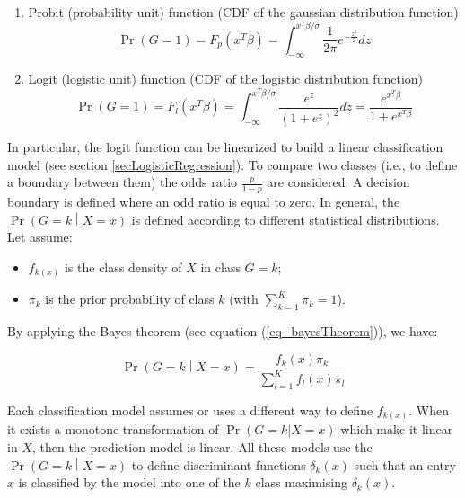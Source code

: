 \begin{enumerate}
    \item Probit (probability unit) function (CDF of the gaussian distribution function)
    \begin{equation}
        \Pr{\left(G=1\right)}=F_p\left(x^T\beta\right)=\int_{-\infty}^{x^T\beta/\sigma}{\frac{1}{2\pi}e^{-\frac{z^2}{2}}dz}
        \label{eq_probit}
    \end{equation}
    
    \item Logit (logistic unit) function (CDF of the logistic distribution function)
    \begin{equation}
        \Pr{\left(G=1\right)}=F_l\left(x^T\beta\right)=\int_{-\infty}^{x^T\beta/\sigma}{\frac{e^z}{\left(1+e^z\right)^2}dz}=\frac{e^{x^T\beta}}{1+e^{x^T\beta}}
        \label{eq_logit}
    \end{equation}
    
\end{enumerate}

In particular, the logit function can be linearized to build a linear classification model (see section \ref{secLogisticRegression}). To compare two classes (i.e., to define a boundary between them) the odds ratio $\frac{p}{1-p}$ are considered. A decision boundary is defined where an odd ratio is equal to zero. In general, the $\Pr{\left(G=k\middle| X=x\right)}$ is defined according to different statistical distributions. Let assume:

\begin{itemize}
    \item $f_{k\left(x\right)}$ is the class density of $X$ in class $G=k$;
    \item $\pi_k$ is the prior probability of class $k$ (with $\sum_{k=1}^{K}{\pi_k=1}$).
\end{itemize}

By applying the Bayes theorem (see equation (\ref{eq_bayesTheorem})), we have:

\begin{equation}
        \Pr{\left(G=k\middle| X=x\right)}=\frac{f_k\left(x\right)\pi_k}{\sum_{l=1}^{K}{f_l\left(x\right)\pi_l}}
        \label{eq_classificationModels}
\end{equation}

Each classification model assumes or uses a different way to define $f_{k\left(x\right)}$. When it exists a monotone transformation of $\Pr(G=k|X=x)$ which make it linear in $X$, then the prediction model is linear. All these models use the $\Pr{\left(G=k\middle| X=x\right)}$ to define discriminant functions $\delta_k(x)$ such that an entry $x$ is classified by the model into one of the $k$ class maximising $\delta_k(x)$.\par

